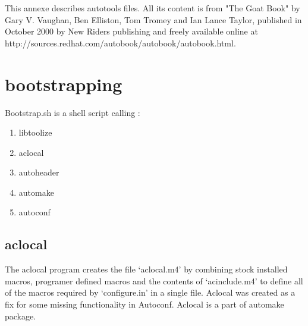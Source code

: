 


This annexe describes autotools files. All its content is from "The Goat Book"
by Gary V. Vaughan, Ben Elliston, Tom Tromey and Ian Lance Taylor, published 
in October 2000 by New Riders publishing and freely available online at 
http://sources.redhat.com/autobook/autobook/autobook.html.


\section{bootstrapping}
Bootstrap.sh is a shell script calling :
\begin{enumerate}
\item{libtoolize}
\item{aclocal}
\item{autoheader}
\item{automake}
\item{autoconf}
\end{enumerate}

\subsection{aclocal}
The aclocal program creates the file `aclocal.m4' by combining stock installed
macros, programer defined macros and the contents of `acinclude.m4' to define all
of the macros required by `configure.in' in a single file. Aclocal was 
created as a fix for some missing functionality in Autoconf. Aclocal is a part of
automake package.

